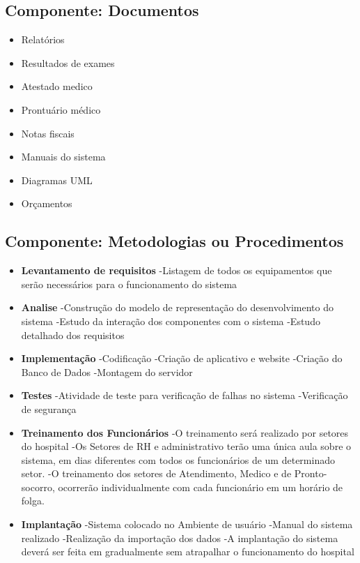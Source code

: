      \subsection{Componente: Documentos }
  \begin{itemize}
  \item Relatórios
  \item Resultados de exames
  \item Atestado medico
  \item Prontuário médico
  \item Notas fiscais
   \item Manuais do sistema
  \item Diagramas UML
  \item Orçamentos
\end{itemize}

     \subsection{Componente: Metodologias ou Procedimentos}
\begin{itemize}
\item \textbf{Levantamento de requisitos}
  \subitem -Listagem de todos os equipamentos que serão necessários para o funcionamento do sistema

 \item\textbf{ Analise}
  \subitem -Construção do modelo de representação do desenvolvimento do sistema
   \subitem -Estudo da interação dos componentes com o sistema
    \subitem  -Estudo detalhado dos requisitos

  \item \textbf{Implementação}
  \subitem -Codificação
   \subitem -Criação de aplicativo e website
    \subitem  -Criação do Banco de Dados
     \subitem -Montagem do servidor
   \item \textbf{Testes}
  \subitem -Atividade de teste para verificação de falhas no sistema
   \subitem -Verificação de segurança

    \item \textbf{Treinamento dos Funcionários}
  \subitem -O treinamento será realizado por setores do hospital
   \subitem -Os Setores de RH e administrativo terão uma única aula sobre o sistema, em dias diferentes com todos os funcionários de um determinado setor.
   \subitem -O treinamento dos setores de Atendimento, Medico e de Pronto-socorro, ocorrerão individualmente com cada funcionário em um horário de folga.

   \item \textbf{Implantação}
  \subitem -Sistema colocado no Ambiente de usuário
   \subitem -Manual do sistema realizado
  \subitem -Realização da importação dos dados
   \subitem -A implantação do sistema deverá ser feita em gradualmente sem atrapalhar o funcionamento do hospital
  \end{itemize}
